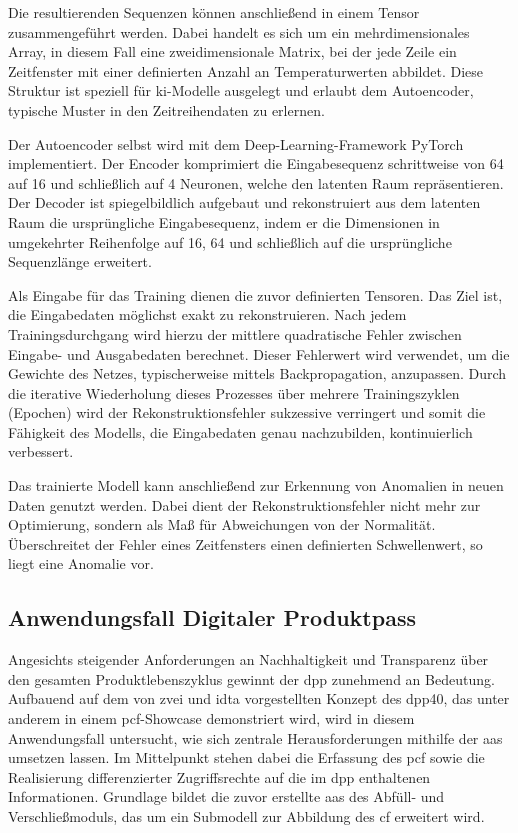 
Die resultierenden Sequenzen können anschließend in einem Tensor zusammengeführt werden. 
Dabei handelt es sich um ein mehrdimensionales Array, in diesem Fall eine zweidimensionale Matrix, bei der jede Zeile ein Zeitfenster mit einer definierten Anzahl an Temperaturwerten abbildet. 
Diese Struktur ist speziell für \acs{ki}-Modelle ausgelegt und erlaubt dem Autoencoder, typische Muster in den Zeitreihendaten zu erlernen.

Der Autoencoder selbst wird mit dem Deep-Learning-Framework PyTorch \cite{PyTorch} implementiert.
Der Encoder komprimiert die Eingabesequenz schrittweise von 64 auf 16 und schließlich auf 4 Neuronen, welche den latenten Raum repräsentieren.
Der Decoder ist spiegelbildlich aufgebaut und rekonstruiert aus dem latenten Raum die ursprüngliche Eingabesequenz, indem er die Dimensionen in umgekehrter Reihenfolge auf 16, 64 und schließlich auf die ursprüngliche Sequenzlänge erweitert.

Als Eingabe für das Training dienen die zuvor definierten Tensoren.
Das Ziel ist, die Eingabedaten möglichst exakt zu rekonstruieren.
Nach jedem Trainingsdurchgang wird hierzu der mittlere quadratische Fehler zwischen Eingabe- und Ausgabedaten berechnet.
Dieser Fehlerwert wird verwendet, um die Gewichte des Netzes, typischerweise mittels Backpropagation, anzupassen.
Durch die iterative Wiederholung dieses Prozesses über mehrere Trainingszyklen (Epochen) wird der Rekonstruktionsfehler sukzessive verringert und somit die Fähigkeit des Modells, die Eingabedaten genau nachzubilden, kontinuierlich verbessert.

Das trainierte Modell kann anschließend zur Erkennung von Anomalien in neuen Daten genutzt werden.
Dabei dient der Rekonstruktionsfehler nicht mehr zur Optimierung, sondern als Maß für Abweichungen von der Normalität.
Überschreitet der Fehler eines Zeitfensters einen definierten Schwellenwert, so liegt eine Anomalie vor.

\newpage
\subsection{Anwendungsfall Digitaler Produktpass}
Angesichts steigender Anforderungen an Nachhaltigkeit und Transparenz über den gesamten Produktlebenszyklus gewinnt der \acs{dpp} zunehmend an Bedeutung.
Aufbauend auf dem von \acs{zvei} und \acs{idta} vorgestellten Konzept des \acs{dpp40}, das unter anderem in einem \acs{pcf}-Showcase \cite{PCFShowcas} demonstriert wird, wird in diesem Anwendungsfall untersucht, wie sich zentrale Herausforderungen mithilfe der \acs{aas} umsetzen lassen.
Im Mittelpunkt stehen dabei die Erfassung des \acs{pcf} sowie die Realisierung differenzierter Zugriffsrechte auf die im \acs{dpp} enthaltenen Informationen.
Grundlage bildet die zuvor erstellte \acs{aas} des Abfüll- und Verschließmoduls, das um ein Submodell zur Abbildung des \acs{cf} erweitert wird.

